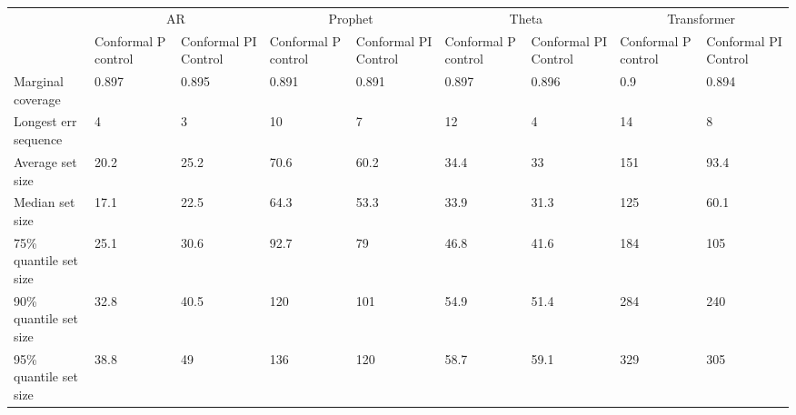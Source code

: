 \begin{tabular}{lllllllll}
\toprule
& \multicolumn{2}{c}{AR}& \multicolumn{2}{c}{Prophet}& \multicolumn{2}{c}{Theta}& \multicolumn{2}{c}{Transformer} \\
& Conformal P control & Conformal PI Control & Conformal P control & Conformal PI Control & Conformal P control & Conformal PI Control & Conformal P control & Conformal PI Control \\
\midrule
Marginal coverage & 0.897 & 0.895 & 0.891 & 0.891 & 0.897 & 0.896 & 0.9 & 0.894 \\
Longest err sequence & 4 & 3 & 10 & 7 & 12 & 4 & 14 & 8 \\
Average set size & 20.2 & 25.2 & 70.6 & 60.2 & 34.4 & 33 & 151 & 93.4 \\
Median set size & 17.1 & 22.5 & 64.3 & 53.3 & 33.9 & 31.3 & 125 & 60.1 \\
75\% quantile set size & 25.1 & 30.6 & 92.7 & 79 & 46.8 & 41.6 & 184 & 105 \\
90\% quantile set size & 32.8 & 40.5 & 120 & 101 & 54.9 & 51.4 & 284 & 240 \\
95\% quantile set size & 38.8 & 49 & 136 & 120 & 58.7 & 59.1 & 329 & 305 \\
\bottomrule
\end{tabular}
